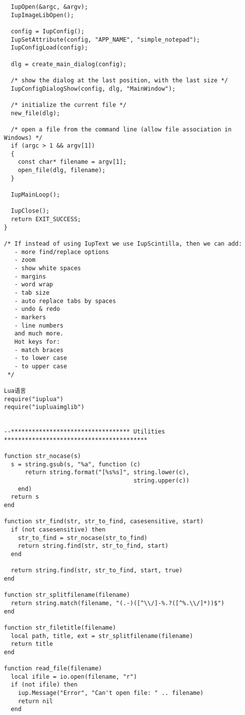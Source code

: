\documentclass{ctexart}
\begin{document}
\begin{lstlisting}
  IupOpen(&argc, &argv);
  IupImageLibOpen();

  config = IupConfig();
  IupSetAttribute(config, "APP_NAME", "simple_notepad");
  IupConfigLoad(config);

  dlg = create_main_dialog(config);

  /* show the dialog at the last position, with the last size */
  IupConfigDialogShow(config, dlg, "MainWindow");

  /* initialize the current file */
  new_file(dlg);

  /* open a file from the command line (allow file association in Windows) */
  if (argc > 1 && argv[1])
  {
    const char* filename = argv[1];
    open_file(dlg, filename);
  }

  IupMainLoop();

  IupClose();
  return EXIT_SUCCESS;
}

/* If instead of using IupText we use IupScintilla, then we can add:
   - more find/replace options
   - zoom
   - show white spaces
   - margins
   - word wrap
   - tab size
   - auto replace tabs by spaces
   - undo & redo
   - markers
   - line numbers
   and much more.
   Hot keys for:
   - match braces
   - to lower case
   - to upper case
 */

Lua语言
require("iuplua")
require("iupluaimglib")


--********************************** Utilities *****************************************

function str_nocase(s)
  s = string.gsub(s, "%a", function (c)
      return string.format("[%s%s]", string.lower(c),
                                     string.upper(c))
    end)
  return s
end

function str_find(str, str_to_find, casesensitive, start)
  if (not casesensitive) then
    str_to_find = str_nocase(str_to_find)
    return string.find(str, str_to_find, start)
  end

  return string.find(str, str_to_find, start, true)
end

function str_splitfilename(filename)
  return string.match(filename, "(.-)([^\\/]-%.?([^%.\\/]*))$")
end

function str_filetitle(filename)
  local path, title, ext = str_splitfilename(filename)
  return title
end

function read_file(filename)
  local ifile = io.open(filename, "r")
  if (not ifile) then
    iup.Message("Error", "Can't open file: " .. filename)
    return nil
  end
  

\end{lstlisting}
\end{document}
